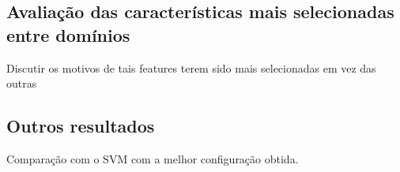 %

\subsection{Avaliação das características mais selecionadas entre domínios}

Discutir os motivos de tais features terem sido mais selecionadas em vez das outras

\subsection{Outros resultados}

Comparação com o SVM com a melhor configuração obtida. 
